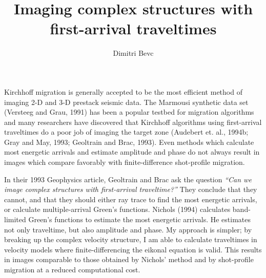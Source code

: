 \title{Imaging complex structures with first-arrival traveltimes}
\author{Dimitri Bevc}
\def\figdir{./Fig}


\INT
Kirchhoff migration is generally accepted to be the most efficient
method of imaging 2-D and 3-D prestack seismic data.
The Marmousi synthetic data set (Versteeg and Grau, 1991) has been a
popular testbed for migration algorithms and many researchers have discovered
that Kirchhoff algorithms using first-arrival traveltimes
do a poor job of imaging the target zone 
(Audebert et. al., 1994b; Gray and May, 1993; Geoltrain and Brac, 1993).
Even methods which calculate most energetic arrivals
and estimate amplitude and phase do not always result in images
which compare favorably with finite-difference shot-profile migration.

In their 1993 Geophysics article, Geoltrain and Brac ask the
question {\em ``Can we image complex structures with first-arrival
traveltime?''} They conclude that they cannot, and that they should 
either ray trace to find the most energetic arrivals, or calculate
multiple-arrival Green's functions. Nichols (1994) calculates 
band-limited Green's functions to estimate the most energetic
arrivals. He estimates not only traveltime, but also amplitude and
phase. My approach is simpler; by breaking up the complex
velocity structure, I am able 
to calculate traveltimes in velocity models where
finite-differencing the eikonal equation is valid.
This results in images comparable to those obtained by 
Nichols' method and by shot-profile migration at a reduced
computational cost.

